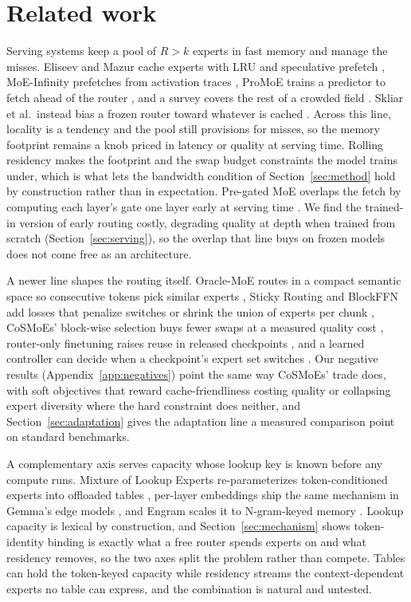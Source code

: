 \documentclass{article}
\begin{document}
\section{Related work}\label{sec:related}

Serving systems keep a pool of $R>k$ experts in fast memory and manage the misses. Eliseev
and Mazur cache experts with LRU and speculative prefetch \citep{eliseev2023}, MoE-Infinity
prefetches from activation traces \citep{xue2024moeinfinity}, ProMoE trains a predictor to
fetch ahead of the router \citep{song2024promoe}, and a survey covers the rest of a crowded
field \citep{liu2024moesurvey}. Skliar et al.\ instead bias a frozen router toward whatever
is cached \citep{skliar2024}. Across this line, locality is a tendency and the pool still
provisions for misses, so the memory footprint remains a knob priced in latency or quality
at serving time. Rolling residency makes the footprint and the swap budget constraints the
model trains under, which is what lets the bandwidth condition of Section~\ref{sec:method}
hold by construction rather than in expectation. Pre-gated MoE overlaps the fetch by
computing each layer's gate one layer early at serving time \citep{hwang2023pregated}. We
find the trained-in version of early routing costly, degrading quality at depth when
trained from scratch (Section~\ref{sec:serving}), so the overlap that line buys on frozen
models does not come free as an architecture.

A newer line shapes the routing itself. Oracle-MoE routes in a compact semantic space so
consecutive tokens pick similar experts \citep{zhou2025oracle}, Sticky Routing and BlockFFN
add losses that penalize switches or shrink the union of experts per chunk
\citep{kayyam2026sticky,song2025blockffn}, CoSMoEs' block-wise selection buys fewer swaps
at a measured quality cost \citep{huber2025cosmoes}, router-only finetuning raises reuse in
released checkpoints \citep{zhu2026reuse,raje2026melinoe}, and a learned controller can
decide when a checkpoint's expert set switches \citep{shen2026temporally}. Our negative
results (Appendix~\ref{app:negatives}) point the same way CoSMoEs' trade does, with soft
objectives that reward cache-friendliness costing quality or collapsing expert diversity
where the hard constraint does neither, and Section~\ref{sec:adaptation} gives the
adaptation line a measured comparison point on standard benchmarks.

A complementary axis serves capacity whose lookup key is known before any compute runs.
Mixture of Lookup Experts re-parameterizes token-conditioned experts into offloaded tables
\citep{jie2025mole}, per-layer embeddings ship the same mechanism in Gemma's edge models
\citep{gemmateam2026}, and Engram scales it to N-gram-keyed memory \citep{cheng2026engram}.
Lookup capacity is lexical by construction, and Section~\ref{sec:mechanism} shows
token-identity binding is exactly what a free router spends experts on and what residency
removes, so the two axes split the problem rather than compete. Tables can hold the
token-keyed capacity while residency streams the context-dependent experts no table can
express, and the combination is natural and untested.
\end{document}
